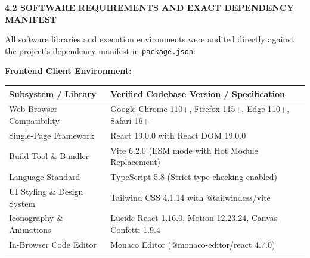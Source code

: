 {\vspace{0.4cm}
{\fontsize{14pt}{18pt}\selectfont\bfseries 4.2 SOFTWARE REQUIREMENTS AND EXACT DEPENDENCY MANIFEST\par}
\vspace{0.3cm}

All software libraries and execution environments were audited directly against the project's dependency manifest in \texttt{package.json}:

\noindent\textbf{Frontend Client Environment:}
\begin{table}[H]
  \centering
  \fontsize{11pt}{15.5pt}\selectfont
  \begin{tabularx}{\textwidth}{@{}p{5.5cm} L@{}}
    \textbf{Subsystem / Library} & \textbf{Verified Codebase Version / Specification} \\
    \midrule
    Web Browser Compatibility & Google Chrome 110+, Firefox 115+, Edge 110+, Safari 16+ \\
    Single-Page Framework & React 19.0.0 with React DOM 19.0.0 \\
    Build Tool \& Bundler & Vite 6.2.0 (ESM mode with Hot Module Replacement) \\
    Language Standard & TypeScript 5.8 (Strict type checking enabled) \\
    UI Styling \& Design System & Tailwind CSS 4.1.14 with @tailwindcss/vite \\
    Iconography \& Animations & Lucide React 1.16.0, Motion 12.23.24, Canvas Confetti 1.9.4 \\
    In-Browser Code Editor & Monaco Editor (@monaco-editor/react 4.7.0) \\
    \bottomrule
  \end{tabularx}
\end{table}

}
